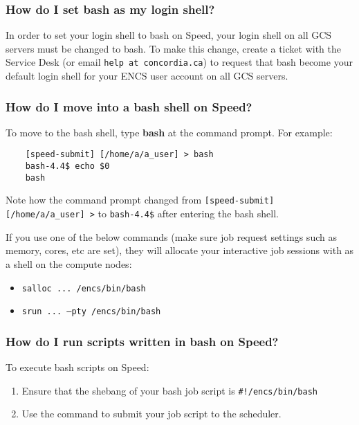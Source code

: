 \subsubsection{How do I set bash as my login shell?}

In order to set your login shell to bash on Speed, your login shell on all GCS servers must be changed to bash.
To make this change, create a ticket with the Service Desk (or email \texttt{help at concordia.ca}) to
request that bash become your default login shell for your ENCS user account on all GCS servers.

\subsubsection{How do I move into a bash shell on Speed?}

To move to the bash shell, type \textbf{bash} at the command prompt.
For example:
\begin{verbatim}
	[speed-submit] [/home/a/a_user] > bash
	bash-4.4$ echo $0
	bash
\end{verbatim}	

Note how the command prompt changed from \verb![speed-submit] [/home/a/a_user] >! to \verb!bash-4.4$! after entering the bash shell.

If you use one of the below commands (make sure job request settings such
as memory, cores, etc are set), they will allocate your interactive
job sessions with  as a shell on the compute nodes:

\begin{itemize}
	\item \texttt{salloc ... /encs/bin/bash}
	\item \texttt{srun ... --pty /encs/bin/bash}
\end{itemize}

\subsubsection{How do I run scripts written in bash on Speed?}

To execute bash scripts on Speed:
\begin{enumerate}
	\item 
Ensure that the shebang of your bash job script is \verb+#!/encs/bin/bash+
	\item 
Use the  command to submit your job script to the scheduler.
\end{enumerate}


